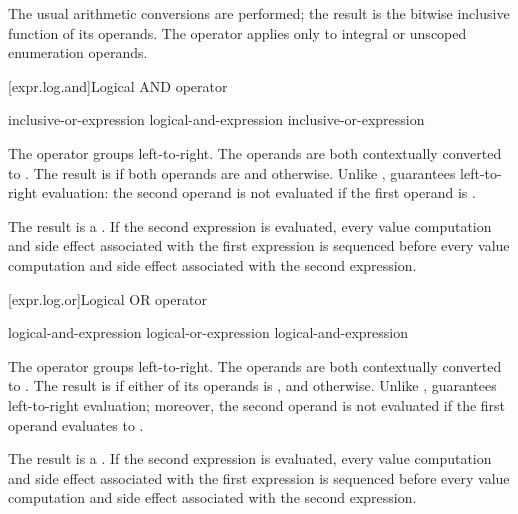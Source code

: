 \pnum
The usual arithmetic conversions are performed; the result is the
bitwise inclusive  function of its operands. The
operator applies only to integral or unscoped enumeration operands.

[expr.log.and]{Logical AND operator}%
%
%
%

\begin{bnf}
\br
    inclusive-or-expression\br
    logical-and-expression \terminal{\&\&} inclusive-or-expression
\end{bnf}

\pnum
The \tcode{\&\&} operator groups left-to-right. The operands are both
contextually converted to .
The
result is  if both operands are  and
 otherwise. Unlike \tcode{\&}, \tcode{\&\&} guarantees
left-to-right evaluation: the second operand is not evaluated if the
first operand is .

\pnum
The result is a .
%
If the second expression is evaluated, every
%
value computation and
side
effect associated with the first expression is sequenced before every
value computation and side effect associated with the second expression.

[expr.log.or]{Logical OR operator}%
%
%
%

\begin{bnf}
\br
    logical-and-expression\br
    logical-or-expression \terminal{||} logical-and-expression
\end{bnf}

\pnum
The \tcode{||} operator groups left-to-right. The operands are both
contextually converted to .
The result is
 if either of its operands is , and
 otherwise. Unlike \tcode{|}, \tcode{||} guarantees
left-to-right evaluation; moreover, the second operand is not evaluated
if the first operand evaluates to .

\pnum
The result is a .
%
If the second expression is evaluated, every
%
value computation and
%
side effect
associated with the first expression is sequenced before every value computation
and side effect associated with the second expression.

